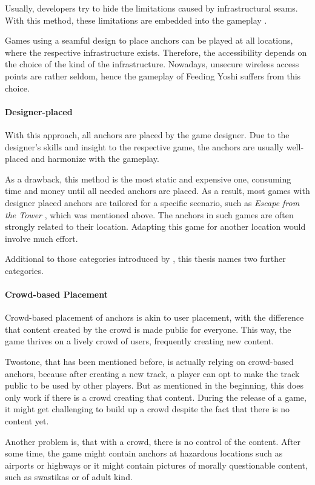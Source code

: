 Usually, developers try to hide the limitations caused by infrastructural seams. With this method, these limitations are embedded into the gameplay \citep{broll2005seamful}.

Games using a seamful design to place anchors can be played at all locations, where the respective infrastructure exists. Therefore, the accessibility depends on the choice of the kind of the infrastructure. Nowadays, unsecure wireless access points are rather seldom, hence the gameplay of Feeding Yoshi suffers from this choice.

\paragraph{Designer-placed}
With this approach, all anchors are placed by the game designer. Due to the designer's skills and insight to the respective game, the anchors are usually well-placed and harmonize with the gameplay.

As a drawback, this method is the most static and expensive one, consuming time and money until all needed anchors are placed. As a result, most games with designer placed anchors are tailored for a specific scenario, such as \emph{Escape from the Tower} \citep{EscapeFromTheTower}, which was mentioned above. The anchors in such games are often strongly related to their location. Adapting this game for another location would involve much effort.

Additional to those categories introduced by \citeauthor{reid2008design}, this thesis names two further categories.

\paragraph{Crowd-based Placement}
Crowd-based placement of anchors is akin to user placement, with the difference that content created by the crowd is made public for everyone. This way, the game thrives on a lively crowd of users, frequently creating new content.

Twostone, that has been mentioned before, is actually relying on crowd-based anchors, because after creating a new track, a player can opt to make the track public to be used by other players. But as mentioned in the beginning, this does only work if there is a crowd creating that content. During the release of a game, it might get challenging to build up a crowd despite the fact that there is no content yet.

Another problem is, that with a crowd, there is no control of the content. After some time, the game might contain anchors at hazardous locations such as airports or highways or it might contain pictures of morally questionable content, such as swastikas or of adult kind.

